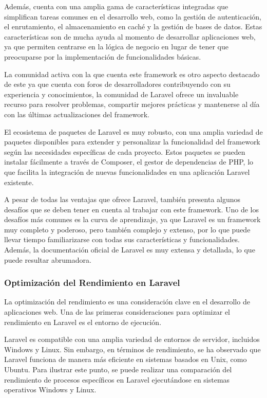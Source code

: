Además, cuenta con una amplia gama de características integradas que simplifican tareas comunes en el desarrollo web, como la gestión de autenticación, el enrutamiento, el almacenamiento en caché y la gestión de bases de datos. Estas características son de mucha ayuda al momento de desarrollar aplicaciones web, ya que permiten centrarse en la lógica de negocio en lugar de tener que preocuparse por la implementación de funcionalidades básicas.

La comunidad activa con la que cuenta este framework es otro aspecto destacado de este ya que cuenta con foros de desarrolladores contribuyendo con su experiencia y conocimientos, la comunidad de Laravel ofrece un invaluable recurso para resolver problemas, compartir mejores prácticas y mantenerse al día con las últimas actualizaciones del framework.

El ecosistema de paquetes de Laravel es muy robusto, con una amplia variedad de paquetes disponibles para extender y personalizar la funcionalidad del framework según las necesidades específicas de cada proyecto. Estos paquetes se pueden instalar fácilmente a través de Composer, el gestor de dependencias de PHP, lo que facilita la integración de nuevas funcionalidades en una aplicación Laravel existente.

A pesar de todas las ventajas que ofrece Laravel, también presenta algunos desafíos que se deben tener en cuenta al trabajar con este framework. Uno de los desafíos más comunes es la curva de aprendizaje, ya que Laravel es un framework muy completo y poderoso, pero también complejo y extenso, por lo que puede llevar tiempo familiarizarse con todas sus características y funcionalidades. Además, la documentación oficial de Laravel es muy extensa y detallada, lo que puede resultar abrumadora.

\subsubsection{Optimización del Rendimiento en Laravel}
La optimización del rendimiento es una consideración clave en el desarrollo de aplicaciones web. Una de las primeras consideraciones para optimizar el rendimiento en Laravel es el entorno de ejecución.

Laravel es compatible con una amplia variedad de entornos de servidor, incluidos Windows y Linux. Sin embargo, en términos de rendimiento, se ha observado que Laravel funciona de manera más eficiente en sistemas basados en Unix, como Ubuntu. Para ilustrar este punto, se puede realizar una comparación del rendimiento de procesos específicos en Laravel ejecutándose en sistemas operativos Windows y Linux.

